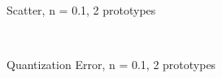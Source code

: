 \documentclass[10pt,a4paper]{article}
\begin{document}
\begin{figure}
  \centering
     \\
  \caption{Scatter, n = 0.1, 2 prototypes}
  \label{fig:n01_k2}
\end{figure}

\begin{figure}
  \centering
{} \\
  \caption{Quantization Error, n = 0.1, 2 prototypes}
  \label{fig:n01_k2_learning}
\end{figure}
\end{document}
